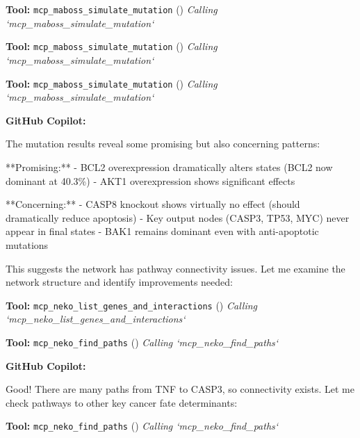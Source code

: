 \documentclass[11pt,a4paper]{article}
\begin{document}
\begin{toolokbox}
\textbf{Tool:} \texttt{mcp\_maboss\_simulate\_mutation} (\checkmark)
\textit{Calling `mcp\_maboss\_simulate\_mutation`}
\end{toolokbox}
\begin{toolokbox}
\textbf{Tool:} \texttt{mcp\_maboss\_simulate\_mutation} (\checkmark)
\textit{Calling `mcp\_maboss\_simulate\_mutation`}
\end{toolokbox}
\begin{toolokbox}
\textbf{Tool:} \texttt{mcp\_maboss\_simulate\_mutation} (\checkmark)
\textit{Calling `mcp\_maboss\_simulate\_mutation`}
\end{toolokbox}
\begin{copilotbox}
\textbf{GitHub Copilot:}

The mutation results reveal some promising but also concerning patterns:

**Promising:**
- BCL2 overexpression dramatically alters states (BCL2 now dominant at 40.3\%)
- AKT1 overexpression shows significant effects

**Concerning:**  
- CASP8 knockout shows virtually no effect (should dramatically reduce apoptosis)
- Key output nodes (CASP3, TP53, MYC) never appear in final states
- BAK1 remains dominant even with anti-apoptotic mutations

This suggests the network has pathway connectivity issues. Let me examine the network structure and identify improvements needed:

\end{copilotbox}
\begin{toolokbox}
\textbf{Tool:} \texttt{mcp\_neko\_list\_genes\_and\_interactions} (\checkmark)
\textit{Calling `mcp\_neko\_list\_genes\_and\_interactions`}
\end{toolokbox}
\begin{toolokbox}
\textbf{Tool:} \texttt{mcp\_neko\_find\_paths} (\checkmark)
\textit{Calling `mcp\_neko\_find\_paths`}
\end{toolokbox}
\begin{copilotbox}
\textbf{GitHub Copilot:}

Good! There are many paths from TNF to CASP3, so connectivity exists. Let me check pathways to other key cancer fate determinants:

\end{copilotbox}
\begin{toolokbox}
\textbf{Tool:} \texttt{mcp\_neko\_find\_paths} (\checkmark)
\textit{Calling `mcp\_neko\_find\_paths`}
\end{toolokbox}
\end{document}
